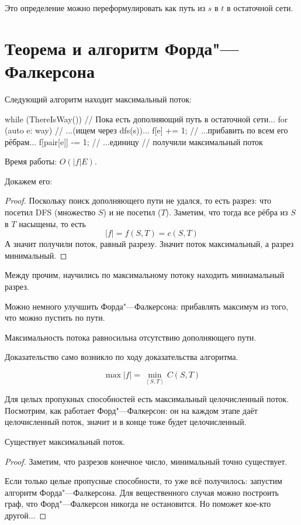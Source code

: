 Это определение можно переформулировать как путь из $s$ в $t$ в остаточной сети.

\section{Теорема и алгоритм Форда"---Фалкерсона}

Следующий алгоритм находит максимальный поток:
\begin{cppcode}
while (ThereIsWay()) {    // Пока есть дополняющий путь в остаточной сети...
	for (auto e: way) {   // ...(ищем через dfs(s))...
		f[e] += 1;        // ...прибавить по всем его рёбрам...
		f[pair[e]] -= 1;  // ...единицу
	}
}
// получили максимальный поток
\end{cppcode}
Время работы: $O(|f| E)$.

Докажем его:
\begin{proof}
	Поскольку поиск дополняющего пути не удался, то есть разрез: что посетил DFS (множество $S$) и не посетил ($T$).
	Заметим, что тогда все рёбра из $S$ в $T$ насыщены, то есть
	\[ |f| = f(S, T) = c(S, T) \]
	А значит получили поток, равный разрезу.
	Значит поток максимальный, а разрез минимальный.
\end{proof}
Между прочим, научились по максимальному потоку находить миниамальный разрез.

Можно немного улучшить Форда"---Фалкерсона: прибавлять максимум из того, что можно пустить по пути.

\begin{theorem}
	Максимальность потока равносильна отсутствию дополняющего пути.
\end{theorem}
Доказательство само возникло по ходу доказательства алгоритма.

\begin{conseq}
	\[ \max |f| = \min_{\left<S, T\right>} C(S, T) \]
\end{conseq}

\begin{Rem}
	Для целых пропукных способностей есть максимальный целочисленный поток.
	Посмотрим, как работает Форд"---Фалкерсон: он на каждом этапе даёт целочисленный поток, значит и в конце тоже будет целочисленный.
\end{Rem}

\begin{lemma}
	Существует максимальный поток.
\end{lemma}
\begin{proof}
	Заметим, что разрезов конечное число, минимальный точно существует.

	Если только целые пропусные способности, то уже всё получилось: запустим алгоритм Форда"---Фалкерсона.
	Для вещественного случая можно построить граф, что Форд"---Фалкерсон никогда не остановится.
	Но поможет кое-кто другой...
\end{proof}

